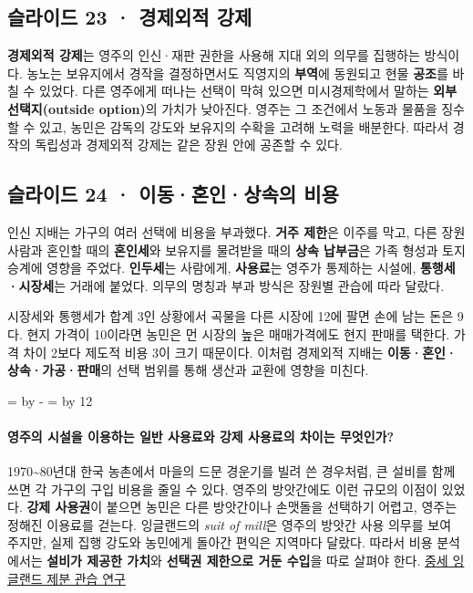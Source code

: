 \documentclass[10pt,a4paper]{article}
\newcommand{\ReserveQuestionSpace}{%
  \par\begingroup
  \dimen0=\pagegoal \advance\dimen0 by -\pagetotal
  \dimen2=\baselineskip \multiply\dimen2 by 12
  \ifdim\dimen0<\dimen2 \newpage\fi
  \endgroup}
\begin{document}
\subsection{슬라이드 23 · 경제외적 강제}
\textbf{경제외적 강제}는 영주의 인신·재판 권한을 사용해 지대 외의 의무를 집행하는 방식이다. 농노는 보유지에서 경작을 결정하면서도 직영지의 \textbf{부역}에 동원되고 현물 \textbf{공조}를 바칠 수 있었다. 다른 영주에게 떠나는 선택이 막혀 있으면 미시경제학에서 말하는 \textbf{외부 선택지(outside option)}의 가치가 낮아진다. 영주는 그 조건에서 노동과 물품을 징수할 수 있고, 농민은 감독의 강도와 보유지의 수확을 고려해 노력을 배분한다. 따라서 경작의 독립성과 경제외적 강제는 같은 장원 안에 공존할 수 있다.\par

\subsection{슬라이드 24 · 이동·혼인·상속의 비용}
인신 지배는 가구의 여러 선택에 비용을 부과했다. \textbf{거주 제한}은 이주를 막고, 다른 장원 사람과 혼인할 때의 \textbf{혼인세}와 보유지를 물려받을 때의 \textbf{상속 납부금}은 가족 형성과 토지 승계에 영향을 주었다. \textbf{인두세}는 사람에게, \textbf{사용료}는 영주가 통제하는 시설에, \textbf{통행세·시장세}는 거래에 붙었다. 의무의 명칭과 부과 방식은 장원별 관습에 따라 달랐다.\par

시장세와 통행세가 합계 3인 상황에서 곡물을 다른 시장에 12에 팔면 손에 남는 돈은 9다. 현지 가격이 10이라면 농민은 먼 시장의 높은 매매가격에도 현지 판매를 택한다. 가격 차이 2보다 제도적 비용 3이 크기 때문이다. 이처럼 경제외적 지배는 \textbf{이동·혼인·상속·가공·판매}의 선택 범위를 통해 생산과 교환에 영향을 미친다.\par

\ReserveQuestionSpace
\paragraph{영주의 시설을 이용하는 일반 사용료와 강제 사용료의 차이는 무엇인가?}
1970\textasciitilde{}80년대 한국 농촌에서 마을의 드문 경운기를 빌려 쓴 경우처럼, 큰 설비를 함께 쓰면 각 가구의 구입 비용을 줄일 수 있다. 영주의 방앗간에도 이런 규모의 이점이 있었다. \textbf{강제 사용권}이 붙으면 농민은 다른 방앗간이나 손맷돌을 선택하기 어렵고, 영주는 정해진 이용료를 걷는다. 잉글랜드의 \emph{suit of mill}은 영주의 방앗간 사용 의무를 보여 주지만, 실제 집행 강도와 농민에게 돌아간 편익은 지역마다 달랐다. 따라서 비용 분석에서는 \textbf{설비가 제공한 가치}와 \textbf{선택권 제한으로 거둔 수입}을 따로 살펴야 한다. \href{https://www.cambridge.org/core/journals/cambridge-archaeological-journal/article/becoming-through-milling-challenging-linear-economic-narratives-in-medieval-england/683486CAAC84B321FC678E2C9AB18B09}{중세 잉글랜드 제분 관습 연구}\par
\end{document}
